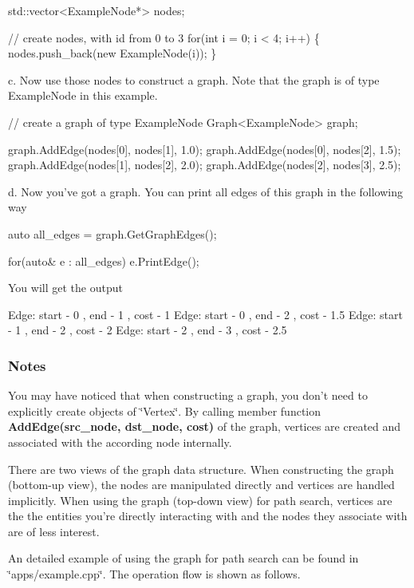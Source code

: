 \begin{DoxyCode}
std::vector<ExampleNode*> nodes;

\textcolor{comment}{// create nodes, with id from 0 to 3}
\textcolor{keywordflow}{for}(\textcolor{keywordtype}{int} i = 0; i < 4; i++) \{
    nodes.push\_back(\textcolor{keyword}{new} ExampleNode(i));
\}
\end{DoxyCode}


c. Now use those nodes to construct a graph. Note that the graph is of type Example\-Node in this example.


\begin{DoxyCode}
\textcolor{comment}{// create a graph of type ExampleNode}
Graph<ExampleNode> graph;

graph.AddEdge(nodes[0], nodes[1], 1.0);
graph.AddEdge(nodes[0], nodes[2], 1.5);
graph.AddEdge(nodes[1], nodes[2], 2.0);
graph.AddEdge(nodes[2], nodes[3], 2.5);
\end{DoxyCode}


d. Now you've got a graph. You can print all edges of this graph in the following way


\begin{DoxyCode}
\textcolor{keyword}{auto} all\_edges = graph.GetGraphEdges();

\textcolor{keywordflow}{for}(\textcolor{keyword}{auto}& e : all\_edges)
    e.PrintEdge();
\end{DoxyCode}


You will get the output


\begin{DoxyCode}
Edge: start - 0 , end - 1 , cost - 1
Edge: start - 0 , end - 2 , cost - 1.5
Edge: start - 1 , end - 2 , cost - 2
Edge: start - 2 , end - 3 , cost - 2.5
\end{DoxyCode}


\subsubsection*{Notes}


\begin{DoxyItemize}
\item You may have noticed that when constructing a graph, you don't need to explicitly create objects of \char`\"{}\-Vertex\char`\"{}. By calling member function {\bfseries Add\-Edge(src\-\_\-node, dst\-\_\-node, cost)} of the graph, vertices are created and associated with the according node internally.
\item There are two views of the graph data structure. When constructing the graph (bottom-\/up view), the nodes are manipulated directly and vertices are handled implicitly. When using the graph (top-\/down view) for path search, vertices are the the entities you're directly interacting with and the nodes they associate with are of less interest.
\item An detailed example of using the graph for path search can be found in \char`\"{}apps/example.\-cpp\char`\"{}. The operation flow is shown as follows.
\end{DoxyItemize}


